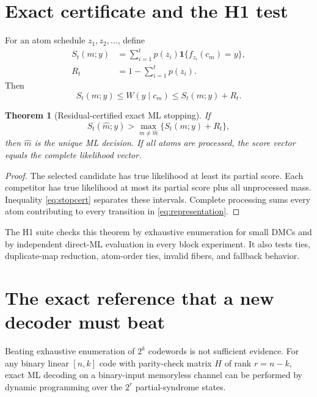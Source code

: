\documentclass[11pt]{article}
\newtheorem{theorem}{Theorem}[section]
\theoremstyle{definition}
\theoremstyle{remark}
\newcommand{\one}{\mathbf 1}
\begin{document}
\section{Exact certificate and the H1 test}

For an atom schedule $z_1,z_2,\ldots$, define
\begin{align}
 S_t(m;y)&=\sum_{i=1}^{t}p(z_i)\one\{f_{z_i}(c_m)=y\},\\
 R_t&=1-\sum_{i=1}^{t}p(z_i).
\end{align}
Then
\begin{equation}
 S_t(m;y)\le W(y\mid c_m)\le S_t(m;y)+R_t.
 \label{eq:residualbound}
\end{equation}

\begin{theorem}[Residual-certified exact ML stopping]
If
\begin{equation}
 S_t(\widehat m;y)>\max_{m\ne\widehat m}\{S_t(m;y)+R_t\},
 \label{eq:stopcert}
\end{equation}
then $\widehat m$ is the unique ML decision. If all atoms are processed, the score vector equals the complete likelihood vector.
\end{theorem}

\begin{proof}
The selected candidate has true likelihood at least its partial score. Each competitor has true likelihood at most its partial score plus all unprocessed mass. Inequality \eqref{eq:stopcert} separates these intervals. Complete processing sums every atom contributing to every transition in \eqref{eq:representation}.
\end{proof}

The H1 suite checks this theorem by exhaustive enumeration for small DMCs and by independent direct-ML evaluation in every block experiment. It also tests ties, duplicate-map reduction, atom-order ties, invalid fibers, and fallback behavior.

\section{The exact reference that a new decoder must beat}

Beating exhaustive enumeration of $2^k$ codewords is not sufficient evidence. For any binary linear $[n,k]$ code with parity-check matrix $H$ of rank $r=n-k$, exact ML decoding on a binary-input memoryless channel can be performed by dynamic programming over the $2^r$ partial-syndrome states.
\end{document}
